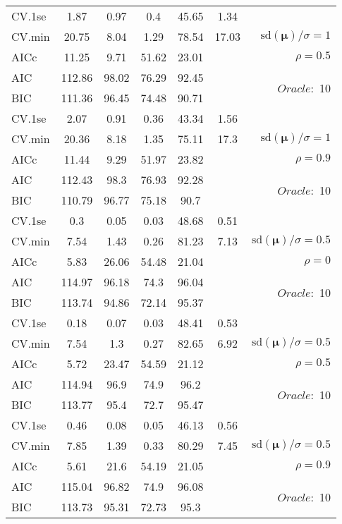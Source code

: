 \begin{table}
\begin{center}
\begin{tabular}{l*{5}{c}|r}
 \hline 
CV.1se & 1.87 & 0.97 & 0.4 & 45.65 & 1.34 & \\
CV.min & 20.75 & 8.04 & 1.29 & 78.54 & 17.03 &  $\mathrm{sd}(\mathbf{\mu})/\sigma=1$ \\
AICc & 11.25 & 9.71 & 51.62 & 23.01 & & $\rho=0.5$ \\
AIC & 112.86 & 98.02 & 76.29 & 92.45 & &  \multirow{2}{*}{$Oracle: $ 10} \\
BIC & 111.36 & 96.45 & 74.48 & 90.71 & &  \\
 \hline 
CV.1se & 2.07 & 0.91 & 0.36 & 43.34 & 1.56 & \\
CV.min & 20.36 & 8.18 & 1.35 & 75.11 & 17.3 &  $\mathrm{sd}(\mathbf{\mu})/\sigma=1$ \\
AICc & 11.44 & 9.29 & 51.97 & 23.82 & & $\rho=0.9$ \\
AIC & 112.43 & 98.3 & 76.93 & 92.28 & &  \multirow{2}{*}{$Oracle: $ 10} \\
BIC & 110.79 & 96.77 & 75.18 & 90.7 & &  \\
 \hline 
CV.1se & 0.3 & 0.05 & 0.03 & 48.68 & 0.51 & \\
CV.min & 7.54 & 1.43 & 0.26 & 81.23 & 7.13 &  $\mathrm{sd}(\mathbf{\mu})/\sigma=0.5$ \\
AICc & 5.83 & 26.06 & 54.48 & 21.04 & & $\rho=0$ \\
AIC & 114.97 & 96.18 & 74.3 & 96.04 & &  \multirow{2}{*}{$Oracle: $ 10} \\
BIC & 113.74 & 94.86 & 72.14 & 95.37 & &  \\
 \hline 
CV.1se & 0.18 & 0.07 & 0.03 & 48.41 & 0.53 & \\
CV.min & 7.54 & 1.3 & 0.27 & 82.65 & 6.92 &  $\mathrm{sd}(\mathbf{\mu})/\sigma=0.5$ \\
AICc & 5.72 & 23.47 & 54.59 & 21.12 & & $\rho=0.5$ \\
AIC & 114.94 & 96.9 & 74.9 & 96.2 & &  \multirow{2}{*}{$Oracle: $ 10} \\
BIC & 113.77 & 95.4 & 72.7 & 95.47 & &  \\
 \hline 
CV.1se & 0.46 & 0.08 & 0.05 & 46.13 & 0.56 & \\
CV.min & 7.85 & 1.39 & 0.33 & 80.29 & 7.45 &  $\mathrm{sd}(\mathbf{\mu})/\sigma=0.5$ \\
AICc & 5.61 & 21.6 & 54.19 & 21.05 & & $\rho=0.9$ \\
AIC & 115.04 & 96.82 & 74.9 & 96.08 & &  \multirow{2}{*}{$Oracle: $ 10} \\
BIC & 113.73 & 95.31 & 72.73 & 95.3 & &  \\
 \hline 
\end{tabular}
\end{center}
\vspace{-1cm}
\end{table}






